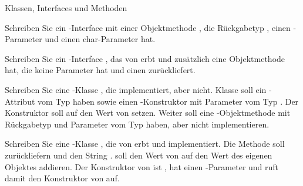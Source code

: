 \documentclass{../tuda-exercise}
\begin{document}
  \begin{task}[credit=\stars{3}{3}]{Klassen, Interfaces und Methoden}
    \begin{subtask}
      Schreiben Sie ein -Interface  mit einer Objektmethode
      , die Rückgabetyp , einen -Parameter
       und einen \textcolor{keywordcolor}{char}-Parameter  hat.

      \begin{solution}
        
      \end{solution}
    \end{subtask}

    \begin{subtask}
      Schreiben Sie ein -Interface , das von  erbt
      und zusätzlich eine Objektmethode  hat, die keine Parameter hat und einen
       zurückliefert.

      \begin{solution}
        
      \end{solution}
    \end{subtask}

    \clearpagesolution

    \begin{subtask}
      Schreiben Sie eine -Klasse , die 
      implementiert, aber  nicht. Klasse  soll ein
      -Attribut  vom Typ  haben sowie einen
      -Konstruktor mit Parameter  vom Typ . Der
      Konstruktor soll  auf den Wert von  setzen. Weiter soll
       eine -Objektmethode  mit Rückgabetyp
       und Parameter  vom Typ  haben, aber nicht
      implementieren.

      \begin{solution}
        
      \end{solution}
    \end{subtask}

    \begin{subtask}
      Schreiben Sie eine -Klasse , die von  erbt
      und  implementiert. Die Methode  soll 
      zurückliefern und  den String \code{\textcolor{stringcolor}{\grqq
      Hallo\grqq}}.  soll den Wert  von auf den Wert
       des eigenen Objektes addieren. Der Konstruktor von  ist
      , hat einen -Parameter  und ruft damit
      den Konstruktor von  auf.


\end{subtask}
\end{task}
\end{document}
